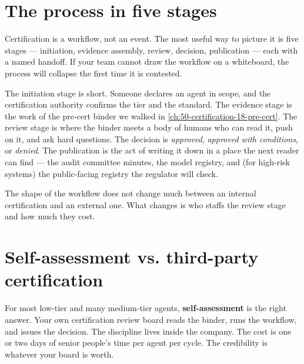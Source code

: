 \label{ch:50-certification-19-process}

\starttwocol

\section{The process in five stages}

Certification is a workflow, not an event. The most useful way to picture it is five stages --- initiation, evidence assembly, review, decision, publication --- each with a named handoff. If your team cannot draw the workflow on a whiteboard, the process will collapse the first time it is contested.

The initiation stage is short. Someone declares an agent in scope, and the certification authority confirms the tier and the standard. The evidence stage is the work of the pre-cert binder we walked in \autoref{ch:50-certification-18-pre-cert}. The review stage is where the binder meets a body of humans who can read it, push on it, and ask hard questions. The decision is \textit{approved}, \textit{approved with conditions}, or \textit{denied}. The publication is the act of writing it down in a place the next reader can find --- the audit committee minutes, the model registry, and (for high-risk systems) the public-facing registry the regulator will check.

The shape of the workflow does not change much between an internal certification and an external one. What changes is who staffs the review stage and how much they cost.

\section{Self-assessment vs. third-party certification}

For most low-tier and many medium-tier agents, \textbf{self-assessment} is the right answer. Your own certification review board reads the binder, runs the workflow, and issues the decision. The discipline lives inside the company. The cost is one or two days of senior people's time per agent per cycle. The credibility is whatever your board is worth.

